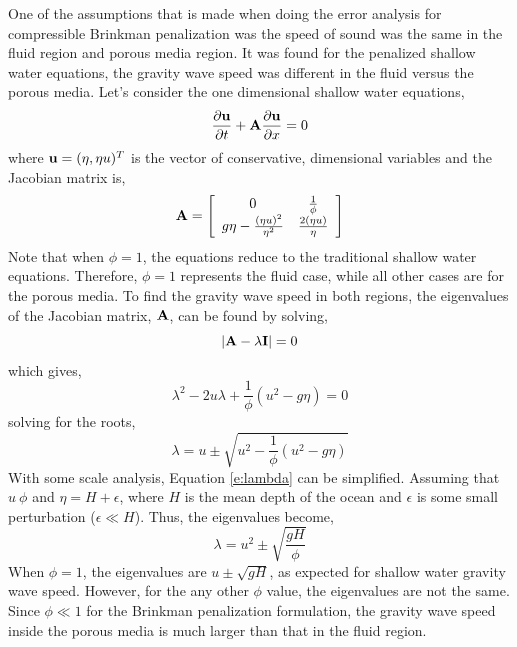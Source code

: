 One of the assumptions that is made when doing the error analysis for compressible Brinkman penalization was the speed of sound was the same in the fluid region and porous media region.  It was found for the penalized shallow water equations, the gravity wave speed was different in the fluid versus the porous media.  Let's consider the one dimensional shallow water equations,
%
\begin{equation} \label{e:1dswe}
\frac{\partial {\bf u}}{\partial t} + {\bf A} \frac{\partial{\bf u}}{\partial x} = 0
\end{equation}
%
where ${\bf u}=(\eta, \eta u)^{T}$ is the vector of conservative, dimensional variables and the Jacobian matrix is, 
%
\begin{equation*}
{\bf A} = \left[ \begin{array}{cc}
0 & \frac{1}{\phi} \\
g \eta - \frac{(\eta u)^2}{\eta^2} & \frac{2 (\eta u)}{\eta} \end{array} \right]
\end{equation*}
%
Note that when $\phi =1$, the equations reduce to the traditional shallow water equations.  Therefore, $\phi=1$ represents the fluid case, while all other cases are for the porous media.  To find the gravity wave speed in both regions, the eigenvalues of the Jacobian matrix, ${\bf A}$, can be found by solving, 
%
\begin{equation*}
|{\bf A} - \lambda {\bf I}|=0
\end{equation*}
%
which gives, 
%
\begin{equation*}
\lambda^2 - 2 u \lambda + \frac{1}{\phi} (u^2 - g \eta)=0
\end{equation*}
%
solving for the roots, 
%
\begin{equation} \label{e:lambda}
\lambda = u \pm \sqrt{u^2 - \frac{1}{\phi} (u^2 - g \eta)}
\end{equation}
%
With some scale analysis, Equation \ref{e:lambda} can be simplified.  Assuming that $u~\phi$ and $\eta = H + \epsilon$, where $H$ is the mean depth of the ocean and $\epsilon$ is some small perturbation ($\epsilon \ll H$).  Thus, the eigenvalues become,  
%
\begin{equation} \label{e:eigenvalues}
\lambda = u^2 \pm \sqrt{\frac{gH}{\phi}}
\end{equation}
%
When $\phi =1$, the eigenvalues are $u \pm \sqrt{gH}$, as expected for shallow water gravity wave speed.  However, for the any other $\phi$ value, the eigenvalues are not the same.  Since $\phi \ll 1$ for the Brinkman penalization formulation, the gravity wave speed inside the porous media is much larger than that in the fluid region.  

